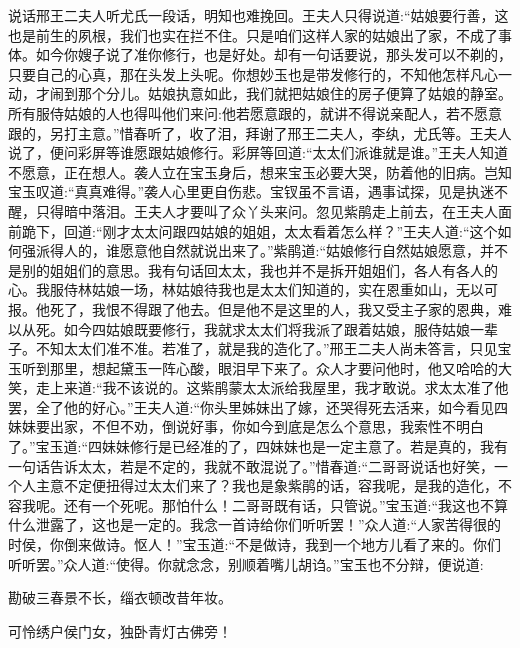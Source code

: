 


\begin{parag}
    说话邢王二夫人听尤氏一段话，明知也难挽回。王夫人只得说道:“姑娘要行善，这也是前生的夙根，我们也实在拦不住。只是咱们这样人家的姑娘出了家，不成了事体。如今你嫂子说了准你修行，也是好处。却有一句话要说，那头发可以不剃的，只要自己的心真，那在头发上头呢。你想妙玉也是带发修行的，不知他怎样凡心一动，才闹到那个分儿。姑娘执意如此，我们就把姑娘住的房子便算了姑娘的静室。所有服侍姑娘的人也得叫他们来问:他若愿意跟的，就讲不得说亲配人，若不愿意跟的，另打主意。”惜春听了，收了泪，拜谢了邢王二夫人，李纨，尤氏等。王夫人说了，便问彩屏等谁愿跟姑娘修行。彩屏等回道:“太太们派谁就是谁。”王夫人知道不愿意，正在想人。袭人立在宝玉身后，想来宝玉必要大哭，防着他的旧病。岂知宝玉叹道:“真真难得。”袭人心里更自伤悲。宝钗虽不言语，遇事试探，见是执迷不醒，只得暗中落泪。王夫人才要叫了众丫头来问。忽见紫鹃走上前去，在王夫人面前跪下，回道:“刚才太太问跟四姑娘的姐姐，太太看着怎么样？”王夫人道:“这个如何强派得人的，谁愿意他自然就说出来了。”紫鹃道:“姑娘修行自然姑娘愿意，并不是别的姐姐们的意思。我有句话回太太，我也并不是拆开姐姐们，各人有各人的心。我服侍林姑娘一场，林姑娘待我也是太太们知道的，实在恩重如山，无以可报。他死了，我恨不得跟了他去。但是他不是这里的人，我又受主子家的恩典，难以从死。如今四姑娘既要修行，我就求太太们将我派了跟着姑娘，服侍姑娘一辈子。不知太太们准不准。若准了，就是我的造化了。”邢王二夫人尚未答言，只见宝玉听到那里，想起黛玉一阵心酸，眼泪早下来了。众人才要问他时，他又哈哈的大笑，走上来道:“我不该说的。这紫鹃蒙太太派给我屋里，我才敢说。求太太准了他罢，全了他的好心。”王夫人道:“你头里姊妹出了嫁，还哭得死去活来，如今看见四妹妹要出家，不但不劝，倒说好事，你如今到底是怎么个意思，我索性不明白了。”宝玉道:“四妹妹修行是已经准的了，四妹妹也是一定主意了。若是真的，我有一句话告诉太太，若是不定的，我就不敢混说了。”惜春道:“二哥哥说话也好笑，一个人主意不定便扭得过太太们来了？我也是象紫鹃的话，容我呢，是我的造化，不容我呢。还有一个死呢。那怕什么！二哥哥既有话，只管说。”宝玉道:“我这也不算什么泄露了，这也是一定的。我念一首诗给你们听听罢！”众人道:“人家苦得很的时侯，你倒来做诗。怄人！”宝玉道:“不是做诗，我到一个地方儿看了来的。你们听听罢。”众人道:“使得。你就念念，别顺着嘴儿胡诌。”宝玉也不分辩，便说道:
\end{parag}


\begin{poem}

    \begin{pl}
        勘破三春景不长，缁衣顿改昔年妆。
    \end{pl}


    \begin{pl}
        可怜绣户侯门女，独卧青灯古佛旁！
    \end{pl}

\end{poem}



